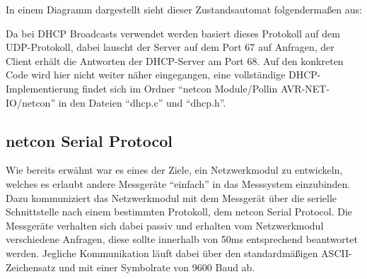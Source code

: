 \documentclass[a4paper,14pt,headsepline]{scrartcl}
\begin{document}
\newpage
In einem Diagramm dargestellt sieht dieser Zustandsautomat folgendermaßen aus:
\begin{figure}[h]
\begin{center}
\end{center}
\end{figure}


Da bei DHCP Broadcasts verwendet werden basiert dieses Protokoll auf dem UDP-Protokoll, dabei lauscht der Server auf dem Port 67 auf Anfragen, der Client erhält die Antworten der DHCP-Server am Port 68. Auf den konkreten Code wird hier nicht weiter näher eingegangen, eine vollständige DHCP-Implementierung findet sich im Ordner "`netcon Module/Pollin AVR-NET-IO/netcon"' in den Dateien "`dhcp.c"' und "`dhcp.h"'.

\subsection{netcon Serial Protocol}
Wie bereits erwähnt war es eines der Ziele, ein Netzwerkmodul zu entwickeln, welches es erlaubt andere Messgeräte "`einfach"' in das Messsystem einzubinden. Dazu kommuniziert das Netzwerkmodul mit dem Messgerät über die serielle Schnittstelle nach einem bestimmten Protokoll, dem netcon Serial Protocol. Die Messgeräte verhalten sich dabei passiv und erhalten vom Netzwerkmodul verschiedene Anfragen, diese sollte innerhalb von 50ms entsprechend beantwortet werden. Jegliche Kommunikation läuft dabei über den standardmäßigen ASCII-Zeichensatz und mit einer Symbolrate von 9600 Baud ab.
\end{document}
